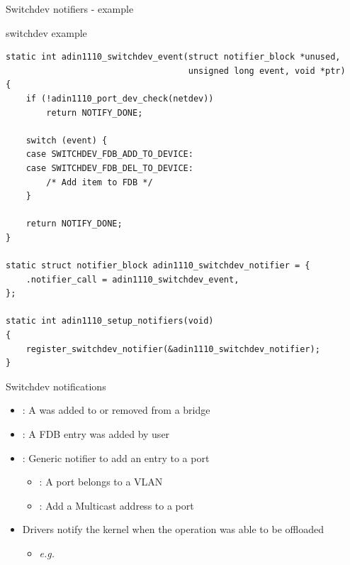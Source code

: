 \begin{frame}[fragile]{Switchdev notifiers - example}
	\begin{block}{switchdev example}
		{\fontsize{7}{8}
	\begin{verbatim}
static int adin1110_switchdev_event(struct notifier_block *unused,
                                    unsigned long event, void *ptr)
{
    if (!adin1110_port_dev_check(netdev))
        return NOTIFY_DONE;

    switch (event) {
    case SWITCHDEV_FDB_ADD_TO_DEVICE:
    case SWITCHDEV_FDB_DEL_TO_DEVICE:
        /* Add item to FDB */
    }

    return NOTIFY_DONE;
}

static struct notifier_block adin1110_switchdev_notifier = {
    .notifier_call = adin1110_switchdev_event,
};

static int adin1110_setup_notifiers(void)
{
    register_switchdev_notifier(&adin1110_switchdev_notifier);
}
\end{verbatim}
	}
	\end{block}
\end{frame}

\begin{frame}{Switchdev notifications}
	\begin{itemize}
		\item {} : A  was added to or removed from a bridge
		\item {} : A FDB entry was added by user
		\item {} : Generic notifier to add an entry to a port
			\begin{itemize}
				\item {} : A port belongs to a VLAN
				\item {} : Add a Multicast address to a port
			\end{itemize}
		\item Drivers notify the kernel when the operation was able to be offloaded
			\begin{itemize}
				\item \textit{e.g.} 
			\end{itemize}
	\end{itemize}
\end{frame}

